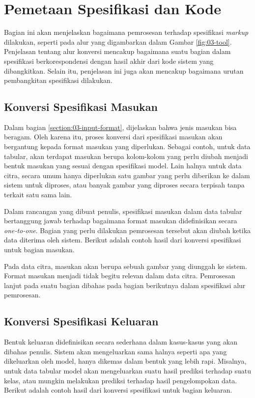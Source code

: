 \section{Pemetaan Spesifikasi dan Kode}

Bagian ini akan menjelaskan bagaimana pemrosesan terhadap spesifikasi \textit{markup} dilakukan, seperti pada alur yang digambarkan dalam Gambar \ref{fig:03-tool}.
Penjelasan tentang alur konversi mencakup bagaimana suatu bagian dalam spesifikasi berkorespondensi dengan hasil akhir dari kode sistem yang dibangkitkan.
Selain itu, penjelasan ini juga akan mencakup bagaimana urutan pembangkitan spesifikasi dilakukan.

\subsection{Konversi Spesifikasi Masukan}

Dalam bagian \ref{section:03-input-format}, dijelaskan bahwa jenis masukan bisa beragam.
Oleh karena itu, proses konversi dari spesifikasi masukan akan bergantung kepada format masukan yang diperlukan.
Sebagai contoh, untuk data tabular, akan terdapat masukan berupa kolom-kolom yang perlu diubah menjadi bentuk masukan yang sesuai dengan spesifikasi model.
Lain halnya untuk data citra, secara umum hanya diperlukan satu gambar yang perlu diberikan ke dalam sistem untuk diproses, atau banyak gambar yang diproses secara terpisah tanpa terkait satu sama lain.

Dalam rancangan yang dibuat penulis, spesifikasi masukan dalam data tabular bertanggung jawab terhadap bagaimana format masukan didefinisikan secara \textit{one-to-one}.
Bagian yang perlu dilakukan pemrosesan tersebut akan diubah ketika data diterima oleh sistem.
Berikut adalah contoh hasil dari konversi spesifikasi untuk bagian masukan.


Pada data citra, masukan akan berupa sebuah gambar yang diunggah ke sistem.
Format masukan menjadi tidak begitu relevan dalam data citra.
Pemrosesan lanjut pada suatu bagian dibahas pada bagian berikutnya dalam spesifikasi alur pemrosesan. 

\subsection{Konversi Spesifikasi Keluaran}

Bentuk keluaran didefinisikan secara sederhana dalam kasus-kasus yang akan dibahas penulis.
Sistem akan mengeluarkan sama halnya seperti apa yang dikeluarkan oleh model, hanya dikemas dalam bentuk yang lebih rapi.
Misalnya, untuk data tabular model akan mengeluarkan suatu hasil prediksi terhadap suatu kelas, atau mungkin melakukan prediksi terhadap hasil pengelompokan data.
Berikut adalah contoh hasil dari konversi spesifikasi untuk bagian keluaran.

